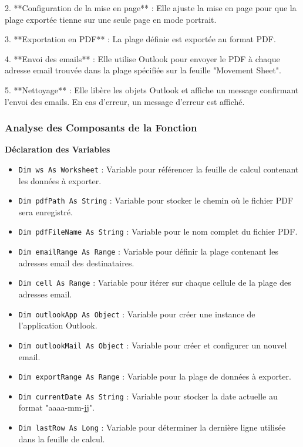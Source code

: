 \documentclass[a4paper, oneside, 12pt, final]{extreport}
\begin{document}
2. **Configuration de la mise en page** : Elle ajuste la mise en page pour que la plage exportée tienne sur une seule page en mode portrait.

3. **Exportation en PDF** : La plage définie est exportée au format PDF.

4. **Envoi des emails** : Elle utilise Outlook pour envoyer le PDF à chaque adresse email trouvée dans la plage spécifiée sur la feuille "Movement Sheet".

5. **Nettoyage** : Elle libère les objets Outlook et affiche un message confirmant l'envoi des emails. En cas d'erreur, un message d'erreur est affiché.

\subsubsection{Analyse des Composants de la Fonction}

\textbf{Déclaration des Variables}

\begin{itemize}
    \item \texttt{Dim ws As Worksheet} : Variable pour référencer la feuille de calcul contenant les données à exporter.
    \item \texttt{Dim pdfPath As String} : Variable pour stocker le chemin où le fichier PDF sera enregistré.
    \item \texttt{Dim pdfFileName As String} : Variable pour le nom complet du fichier PDF.
    \item \texttt{Dim emailRange As Range} : Variable pour définir la plage contenant les adresses email des destinataires.
    \item \texttt{Dim cell As Range} : Variable pour itérer sur chaque cellule de la plage des adresses email.
    \item \texttt{Dim outlookApp As Object} : Variable pour créer une instance de l'application Outlook.
    \item \texttt{Dim outlookMail As Object} : Variable pour créer et configurer un nouvel email.
    \item \texttt{Dim exportRange As Range} : Variable pour la plage de données à exporter.

    \item \texttt{Dim currentDate As String} : Variable pour stocker la date actuelle au format "aaaa-mm-jj".
    \item \texttt{Dim lastRow As Long} : Variable pour déterminer la dernière ligne utilisée dans la feuille de calcul.
\end{itemize}
\end{document}
